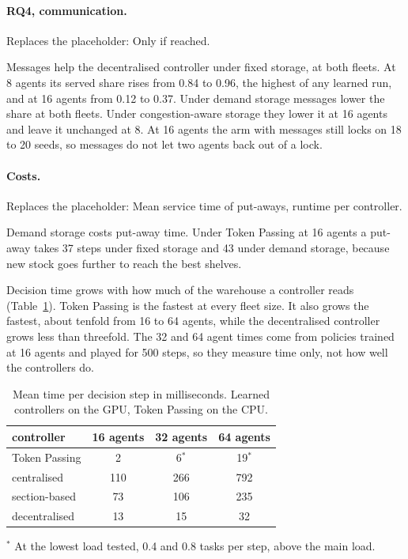 \documentclass[11pt,a4paper]{article}
\newcommand{\placeholder}[1]{\textcolor{plc}{\small Replaces the placeholder: #1}\par}
\begin{document}
\paragraph{RQ4, communication.}
\placeholder{Only if reached.}
Messages help the decentralised controller under fixed storage, at both fleets. At 8 agents its
served share rises from 0.84 to 0.96, the highest of any learned run, and at 16 agents from 0.12 to
0.37. Under demand storage messages lower the share at both fleets. Under congestion-aware storage
they lower it at 16 agents and leave it unchanged at 8. At 16 agents the arm with messages still
locks on 18 to 20 seeds, so messages do not let two agents back out of a lock.

\paragraph{Costs.}
\placeholder{Mean service time of put-aways, runtime per controller.}
Demand storage costs put-away time. Under Token Passing at 16 agents a put-away takes 37 steps under
fixed storage and 43 under demand storage, because new stock goes further to reach the best shelves.

Decision time grows with how much of the warehouse a controller reads (Table~\ref{tab:time}).
Token Passing is the fastest at every fleet size. It also grows the fastest, about tenfold from 16
to 64 agents, while the decentralised controller grows less than threefold. The 32 and 64 agent
times come from policies trained at 16 agents and played for 500 steps, so they measure time only,
not how well the controllers do.

\begin{table}[H]
  \centering
  \caption{Mean time per decision step in milliseconds. Learned controllers on the GPU, Token
    Passing on the CPU.}
  \label{tab:time}
  \small
  \begin{tabular}{l ccc}
    \toprule
    controller & 16 agents & 32 agents & 64 agents \\
    \midrule
    Token Passing  & 2   & 6$^\ast$   & 19$^\ast$ \\
    centralised    & 110 & 266 & 792 \\
    section-based  & 73  & 106 & 235 \\
    decentralised  & 13  & 15  & 32 \\
    \bottomrule
  \end{tabular}

  \smallskip
  {\footnotesize $^\ast$ At the lowest load tested, 0.4 and 0.8 tasks per step, above the main load.}
\end{table}
\end{document}
